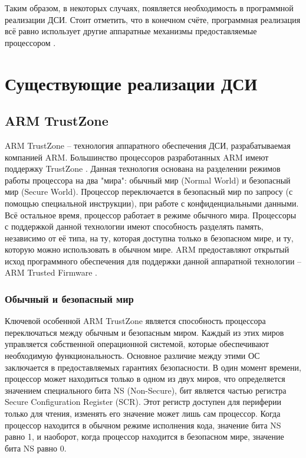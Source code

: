 Таким образом, в некоторых случаях, появляется необходимость в программной реализации ДСИ. Стоит отметить, что в конечном счёте, программная реализация всё равно использует другие аппаратные механизмы предоставляемые процессором \cite{comparsion-arm-intel}.
 
\section{Существующие реализации ДСИ}

\subsection{ARM TrustZone}

ARM TrustZone -- технология аппаратного обеспечения ДСИ, разрабатываемая компанией ARM. Большинство процессоров разработанных ARM имеют поддержку TrustZone \cite{comparsion-arm-intel}. Данная технология основана на разделении режимов работы процессора на два "мира": обычный мир (Normal World) и безопасный мир (Secure World). Процессор переключается в безопасный мир по запросу (с помощью специальной инструкции), при работе с конфиденциальными данными. Всё остальное время, процессор работает в режиме обычного мира. Процессоры с поддержкой данной технологии имеют способность разделять память, независимо от её типа, на ту, которая доступна только в безопасном мире, и ту, которую можно использовать в обычном мире. ARM предоставляют открытый исход программного обеспечения для поддержки данной аппаратной технологии -- ARM Trusted Firmware \cite{arm-tfa}.

\subsubsection{Обычный и безопасный мир}

Ключевой особенной ARM TrustZone является способность процессора переключаться между обычным и безопасным миром. Каждый из этих миров управляется собственной операционной системой, которые обеспечивают необходимую функциональность. Основное различие между этими ОС заключается в предоставляемых гарантиях безопасности. В один момент времени, процессор может находиться только в одном из двух миров, что определяется значением специального бита NS (Non-Secure), бит является частью регистра Secure Configuration Register (SCR). Этот регистр доступен для периферии только для чтения, изменять его значение может лишь сам процессор. Когда процессор находится в обычном режиме исполнения кода, значение бита NS равно 1, и наоборот, когда процессор находится в безопасном мире, значение бита NS равно 0.

